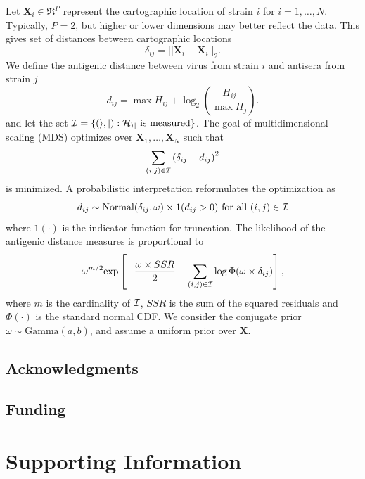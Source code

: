 \documentclass[11pt,oneside,letterpaper]{article}
\begin{document}
Let $\mathbf{X}_i \in \Re^{P}$ represent the cartographic location of strain $i$ for $i = 1,\ldots, N$.
Typically, $P = 2$, but higher or lower dimensions may better reflect the data.  
This gives set of distances between cartographic locations 
\begin{equation}
	\delta_{ij} =  || \mathbf{X}_i - \mathbf{X}_i ||_2.
\end{equation}
We define the antigenic distance between virus from strain $i$ and antisera from strain $j$
\begin{equation}
	d_{ij} =  \max{ H_{ij} } + 
	\log_2 \left(   
		\frac{ H_{ij} }{ \max{ H_j } }
	\right).
\end{equation}
and let the set $\cal I = \{ (i,j) : H_{ij} \mbox{ is measured} \}$.
The goal of multidimensional scaling (MDS) optimizes over $\mathbf{X}_1,\ldots,\mathbf{X}_N$ such that
\begin{equation}
	\sum_{(i,j) \in \cal I} 
	\left(
		\delta_{ij} - d_{ij}
	\right)^2
\end{equation}
is minimized. 
A probabilistic interpretation reformulates the optimization as
\begin{equation} 
d_{ij} \sim \mbox{Normal}( \delta_{ij}, \omega ) \times 1( d_{ij} > 0 ) \mbox{ for all } (i,j) \in \cal I
\end{equation}
where $1 ( \cdot )$ is the indicator function for truncation. 
The likelihood of the antigenic distance measures is proportional to
\begin{equation}
\omega^{m/2} \mbox{exp} \left[
- \frac{\omega \times SSR}{2} - \sum_{(i,j) \in \cal I} \log \Phi (\omega \times \delta_{ij})
\right],
\end{equation}
where $m$ is the cardinality of $\cal I$, $SSR$ is the sum of the squared residuals and $\Phi(\cdot)$ is the standard normal CDF. 
We consider the conjugate prior $\omega \sim \mbox{Gamma}(a, b)$, and assume a uniform
prior over $\mathbf{X}$.

\subsection*{Acknowledgments} 

\subsection*{Funding} 




\pagebreak

\setcounter{figure}{0}
\setcounter{table}{0}
\setcounter{page}{1}
\renewcommand{\thefigure}{S\arabic{figure}}
\renewcommand{\thetable}{S\arabic{table}}
\renewcommand{\thepage}{S\arabic{page}}

\section*{Supporting Information}

\pagebreak
\end{document}
